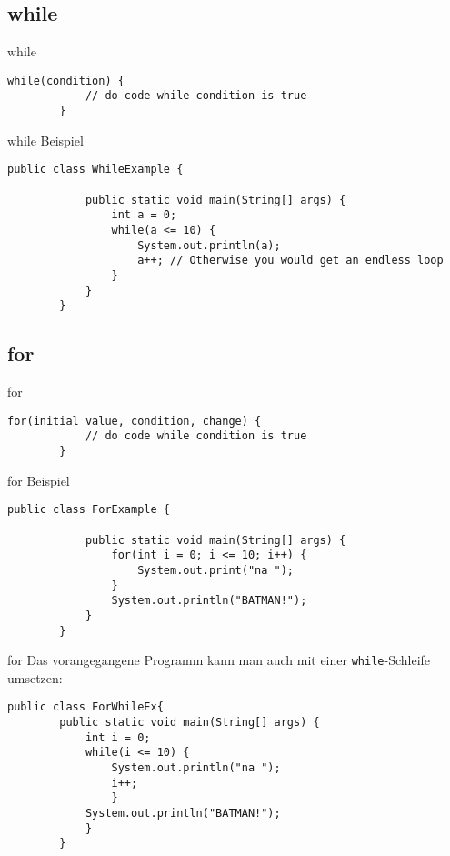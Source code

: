 \subsection{while}
\begin{frame}[fragile]{while}
    \begin{lstlisting}[gobble=8]
        while(condition) {
            // do code while condition is true
        }
    \end{lstlisting}
\end{frame}

\begin{frame}[fragile]{while Beispiel}
    \begin{lstlisting}[gobble=8]
        public class WhileExample {

            public static void main(String[] args) {
                int a = 0;
                while(a <= 10) {
                    System.out.println(a);
                    a++; // Otherwise you would get an endless loop
                }
            }        
        }
    \end{lstlisting}
\end{frame}

\subsection{for}
\begin{frame}[fragile]{for}
    \begin{lstlisting}[gobble=8]
        for(initial value, condition, change) {
	        // do code while condition is true
        }
    \end{lstlisting}
\end{frame}

\begin{frame}[fragile]{for Beispiel}
    \begin{lstlisting}[gobble=8]
        public class ForExample {

            public static void main(String[] args) {
                for(int i = 0; i <= 10; i++) {
                    System.out.print("na ");
                }
                System.out.println("BATMAN!");
            }        
        }
    \end{lstlisting}
\end{frame}

\begin{frame}[fragile]{for}
    Das vorangegangene Programm kann man auch mit einer \texttt{while}-Schleife umsetzen:
    \begin{lstlisting}[gobble=8]
        public class ForWhileEx{
        public static void main(String[] args) {
            int i = 0;
            while(i <= 10) {
                System.out.println("na ");
                i++;
                }
            System.out.println("BATMAN!");
            }
        }
    \end{lstlisting}
\end{frame}

